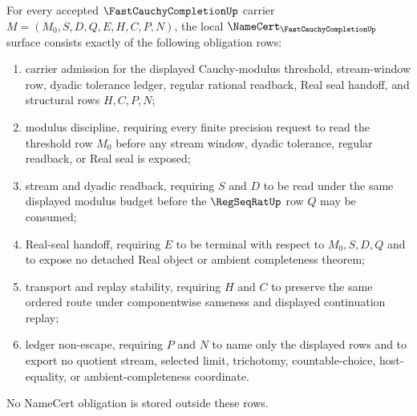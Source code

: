 \begin{theorem}
\label{thm:fast-cauchy-completion-namecert-obligations}
For every accepted $\FastCauchyCompletionUp$ carrier $M=(M_0,S,D,Q,E,H,C,P,N)$, the local $\NameCert_{\FastCauchyCompletionUp}$ surface consists exactly of the following obligation rows:
\begin{enumerate}
\item carrier admission for the displayed Cauchy-modulus threshold, stream-window row, dyadic tolerance ledger, regular rational readback, Real seal handoff, and structural rows $H,C,P,N$;
\item modulus discipline, requiring every finite precision request to read the threshold row $M_0$ before any stream window, dyadic tolerance, regular readback, or Real seal is exposed;
\item stream and dyadic readback, requiring $S$ and $D$ to be read under the same displayed modulus budget before the $\RegSeqRatUp$ row $Q$ may be consumed;
\item Real-seal handoff, requiring $E$ to be terminal with respect to $M_0,S,D,Q$ and to expose no detached Real object or ambient completeness theorem;
\item transport and replay stability, requiring $H$ and $C$ to preserve the same ordered route under componentwise sameness and displayed continuation replay;
\item ledger non-escape, requiring $P$ and $N$ to name only the displayed rows and to export no quotient stream, selected limit, trichotomy, countable-choice, host-equality, or ambient-completeness coordinate.
\end{enumerate}
No NameCert obligation is stored outside these rows.
\end{theorem}
